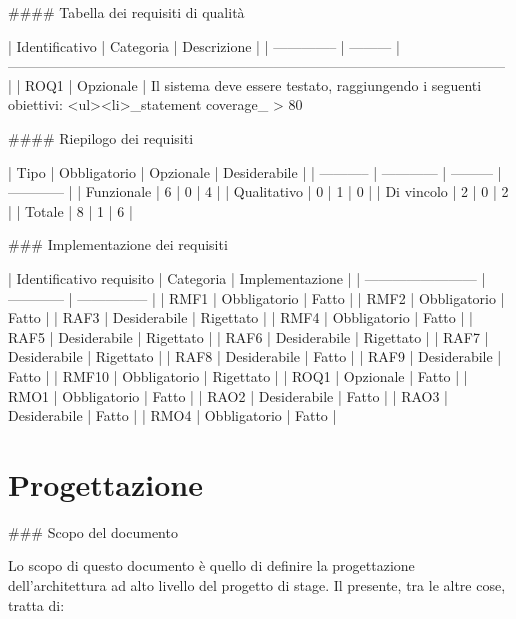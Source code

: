 #### Tabella dei requisiti di qualità

| Identificativo | Categoria | Descrizione                                                                                                 |
| -------------- | --------- | ----------------------------------------------------------------------------------------------------------- |
| ROQ1           | Opzionale | Il sistema deve essere testato, raggiungendo i seguenti obiettivi: <ul><li>_statement coverage_ > 80 %


#### Riepilogo dei requisiti

| Tipo        | Obbligatorio | Opzionale | Desiderabile |
| ----------- | ------------ | --------- | ------------ |
| Funzionale  | 6            | 0         | 4            |
| Qualitativo | 0            | 1         | 0            |
| Di vincolo  | 2            | 0         | 2            |
| Totale      | 8            | 1         | 6            |


### Implementazione dei requisiti

| Identificativo requisito | Categoria    | Implementazione |
| ------------------------ | ------------ | --------------- |
| RMF1                     | Obbligatorio | Fatto           |
| RMF2                     | Obbligatorio | Fatto           |
| RAF3                     | Desiderabile | Rigettato       |
| RMF4                     | Obbligatorio | Fatto           |
| RAF5                     | Desiderabile | Rigettato       |
| RAF6                     | Desiderabile | Rigettato       |
| RAF7                     | Desiderabile | Rigettato       |
| RAF8                     | Desiderabile | Fatto           |
| RAF9                     | Desiderabile | Fatto           |
| RMF10                    | Obbligatorio | Rigettato       |
| ROQ1                     | Opzionale    | Fatto           |
| RMO1                     | Obbligatorio | Fatto           |
| RAO2                     | Desiderabile | Fatto           |
| RAO3                     | Desiderabile | Fatto           |
| RMO4                     | Obbligatorio | Fatto           |

\section{Progettazione}

### Scopo del documento

Lo scopo di questo documento è quello di definire la progettazione dell'architettura ad alto livello del progetto di stage.
Il presente, tra le altre cose, tratta di:


